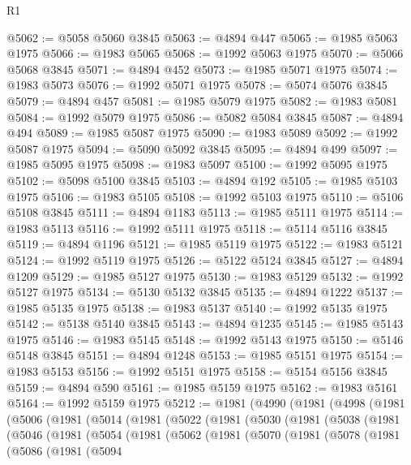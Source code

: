\begin{lexlean}{R1}
\begin{coremodule}
@5062 := @5058 @5060 @3845
@5063 := @4894 @447
@5065 := @1985 @5063 @1975
@5066 := @1983 @5065
@5068 := @1992 @5063 @1975
@5070 := @5066 @5068 @3845
@5071 := @4894 @452
@5073 := @1985 @5071 @1975
@5074 := @1983 @5073
@5076 := @1992 @5071 @1975
@5078 := @5074 @5076 @3845
@5079 := @4894 @457
@5081 := @1985 @5079 @1975
@5082 := @1983 @5081
@5084 := @1992 @5079 @1975
@5086 := @5082 @5084 @3845
@5087 := @4894 @494
@5089 := @1985 @5087 @1975
@5090 := @1983 @5089
@5092 := @1992 @5087 @1975
@5094 := @5090 @5092 @3845
@5095 := @4894 @499
@5097 := @1985 @5095 @1975
@5098 := @1983 @5097
@5100 := @1992 @5095 @1975
@5102 := @5098 @5100 @3845
@5103 := @4894 @192
@5105 := @1985 @5103 @1975
@5106 := @1983 @5105
@5108 := @1992 @5103 @1975
@5110 := @5106 @5108 @3845
@5111 := @4894 @1183
@5113 := @1985 @5111 @1975
@5114 := @1983 @5113
@5116 := @1992 @5111 @1975
@5118 := @5114 @5116 @3845
@5119 := @4894 @1196
@5121 := @1985 @5119 @1975
@5122 := @1983 @5121
@5124 := @1992 @5119 @1975
@5126 := @5122 @5124 @3845
@5127 := @4894 @1209
@5129 := @1985 @5127 @1975
@5130 := @1983 @5129
@5132 := @1992 @5127 @1975
@5134 := @5130 @5132 @3845
@5135 := @4894 @1222
@5137 := @1985 @5135 @1975
@5138 := @1983 @5137
@5140 := @1992 @5135 @1975
@5142 := @5138 @5140 @3845
@5143 := @4894 @1235
@5145 := @1985 @5143 @1975
@5146 := @1983 @5145
@5148 := @1992 @5143 @1975
@5150 := @5146 @5148 @3845
@5151 := @4894 @1248
@5153 := @1985 @5151 @1975
@5154 := @1983 @5153
@5156 := @1992 @5151 @1975
@5158 := @5154 @5156 @3845
@5159 := @4894 @590
@5161 := @1985 @5159 @1975
@5162 := @1983 @5161
@5164 := @1992 @5159 @1975
@5212 := @1981
    (@4990
      (@1981
        (@4998
          (@1981
            (@5006
              (@1981
                (@5014
                  (@1981
                    (@5022
                      (@1981
                        (@5030
                          (@1981
                            (@5038
                              (@1981
                                (@5046
                                  (@1981
                                    (@5054
                                      (@1981
                                        (@5062
                                          (@1981
                                            (@5070
                                              (@1981
                                                (@5078
                                                  (@1981
                                                    (@5086
                                                      (@1981
                                                        (@5094

\end{coremodule}
\end{lexlean}
